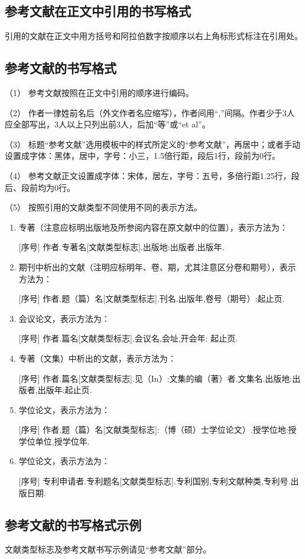 \subsection{参考文献在正文中引用的书写格式}
引用的文献在正文中用方括号和阿拉伯数字按顺序以右上角标形式标注在引用处。

\subsection{参考文献的书写格式}
（1） 参考文献按照在正文中引用的顺序进行编码。

（2） 作者一律姓前名后（外文作者名应缩写），作者间用“,”间隔。作者少于3人应全部写出，3人以上只列出前3人，后加“等”或“et al”。

（3） 标题“参考文献”选用模板中的样式所定义的“参考文献”，再居中；或者手动设置成字体：黑体，居中，字号：小三，1.5倍行距，段后1行，段前为0行。

（4） 参考文献正文设置成字体：宋体，居左，字号：五号，多倍行距1.25行，段后、段前均为0行。

（5） 按照引用的文献类型不同使用不同的表示方法。
\begin{enumerate}[label=\circled{\arabic*}]
\item 专著（注意应标明出版地及所参阅内容在原文献中的位置），表示方法为：

[序号] 作者.专著名[文献类型标志].出版地:出版者,出版年.
\item 期刊中析出的文献（注明应标明年、卷、期，尤其注意区分卷和期号），表示方法为：

[序号] 作者.题（篇）名[文献类型标志].刊名.出版年,卷号（期号）:起止页.
\item 会议论文，表示方法为：

[序号] 作者.篇名[文献类型标志].会议名,会址,开会年: 起止页.
\item 专著（文集）中析出的文献，表示方法为：

[序号] 作者.篇名[文献类型标志].见（In）:文集的编（著）者.文集名.出版地:出版者,出版年:起止页.
\item 学位论文，表示方法为：

[序号] 作者.题（篇）名[文献类型标志]:（博（硕）士学位论文）.授学位地:授学位单位,授学位年.
\item 学位论文，表示方法为：

[序号] 专利申请者.专利题名[文献类型标志].专利国别,专利文献种类,专利号.出版日期.
\end{enumerate}

\subsection{参考文献的书写格式示例}
文献类型标志及参考文献书写示例请见“参考文献”部分。

